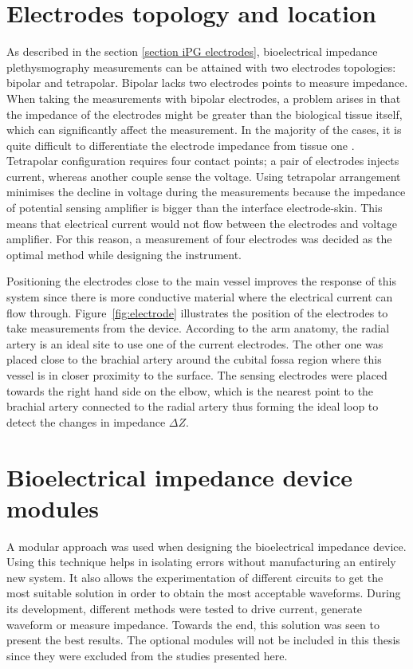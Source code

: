 \section{Electrodes topology and location}
\label{section design electrodes}
As described in the section \ref{section iPG electrodes}, bioelectrical impedance plethysmography measurements can be attained with two electrodes topologies: bipolar and tetrapolar. Bipolar lacks two electrodes points to measure impedance. When taking the measurements with bipolar electrodes, a problem arises in that the impedance of the electrodes might be greater than the biological tissue itself, which can significantly affect the measurement. In the majority of the cases, it is quite difficult to differentiate the electrode impedance from tissue one \cite{brown2000bipolar}. Tetrapolar configuration requires four contact points; a pair of electrodes injects current, whereas another couple sense the voltage. Using tetrapolar arrangement minimises the decline in voltage during the measurements because the impedance of potential sensing amplifier is bigger than the interface electrode-skin. This means that electrical current would not flow between the electrodes and voltage amplifier. For this reason, a measurement of four electrodes was decided as the optimal method while designing the instrument. 

Positioning the electrodes close to the main vessel improves the response of this system since there is more conductive material where the electrical current can flow through. Figure~\ref{fig:electrode} illustrates the position of the electrodes to take measurements from the device. According to the arm anatomy, the radial artery is an ideal site to use one of the current electrodes. The other one was placed close to the brachial artery around the cubital fossa region where this vessel is in closer proximity to the surface. The sensing electrodes were placed towards the right hand side on the elbow, which is the nearest point to the brachial artery connected to the radial artery thus forming the ideal loop to detect the changes in impedance $\Delta Z$.  

\section{Bioelectrical impedance device modules}
A modular approach was used when designing the bioelectrical impedance device. Using this technique helps in isolating errors without manufacturing an entirely new system. It also allows the experimentation of different circuits to get the most suitable solution in order to obtain the most acceptable waveforms. During its development, different methods were tested to drive current, generate waveform or measure impedance. Towards the end, this solution was seen to present the best results. The optional modules will not be included in this thesis since they were excluded from the studies presented here.

